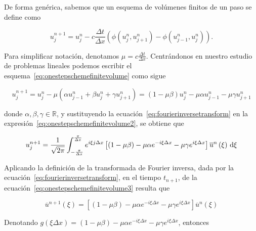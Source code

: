 De forma genérica, sabemos que un esquema de volúmenes finitos de un
paso se define como

\begin{equation}\label{eq:onestepschemefinitevolume}
  u^{n+1}_{j}=
  u^{n}_{j}-
  c\frac{\Delta t}{\Delta x}
  \left(
  \phi\left(u^{n}_{j},u^{n}_{j+1}\right)-
  \phi\left(u^{n}_{j-1},u^{n}_{j}\right)
  \right).
\end{equation}

Para simplificar notación, denotamos
\begin{math}
  \mu=
  c\frac{\Delta t}{\Delta x}
\end{math}.
Centrándonos en nuestro estudio de problemas lineales podemos
escribir el esquema~\eqref{eq:onestepschemefinitevolume} como sigue

\begin{equation}\label{eq:onestepschemefinitevolume2}
  u^{n+1}_{j}=
  u^{n}_{j}-
  \mu
  \left(
  \alpha u^{n}_{j-1}+
  \beta u^{n}_{j}+
  \gamma u^{n}_{j+1}
  \right)=
  \left(1-\mu\beta\right)
  u_j^n-
  \mu\alpha
  u^{n}_{j-1}-
  \mu\gamma
  u^{n}_{j+1}
\end{equation}

donde $\alpha,\beta,\gamma\in\mathbb{R}$, y sustituyendo la
ecuación~\eqref{eq:fourierinversetransform} en la
expresión~\eqref{eq:onestepschemefinitevolume2}, se obtiene que

\begin{equation}\label{eq:onestepschemefinitevolume3}
  u^{n+1}_{j}=
  \frac{1}{\sqrt{2\pi}}
  \int_{-\frac{\pi}{\Delta x}}^{\frac{\pi}{\Delta x}}
  e^{i\xi j\Delta x}
  \left[
    \left(1-\mu\beta\right)-
    \mu\alpha
    e^{-i\xi\Delta x}-
    \mu\gamma
    e^{i\xi\Delta x}
    \right]
  \overline{u}^{n}\left(\xi\right)
  \dl\xi
\end{equation}

Aplicando la definición de la transformada de Fourier inversa, dada
por la ecuación~\eqref{eq:fourierinversetransform}, en el tiempo
$t_{n+1}$, de la ecuación~\eqref{eq:onestepschemefinitevolume3}
resulta que

\begin{equation*}
  \overline{u}^{n+1}
  \left(\xi\right)=
  \left[
    \left(1-\mu\beta\right)-
    \mu\alpha
    e^{-i\xi\Delta x}-
    \mu\gamma e^{i\xi\Delta x}
    \right]
  \overline{u}^{n}
  \left(\xi\right)
\end{equation*}

Denotando
\begin{math}
  g
  \left(\xi\Delta x\right)=
  \left(1-\mu\beta\right)-
  \mu\alpha
  e^{-i\xi\Delta x}-
  \mu\gamma
  e^{i\xi\Delta x}
\end{math},
entonces

